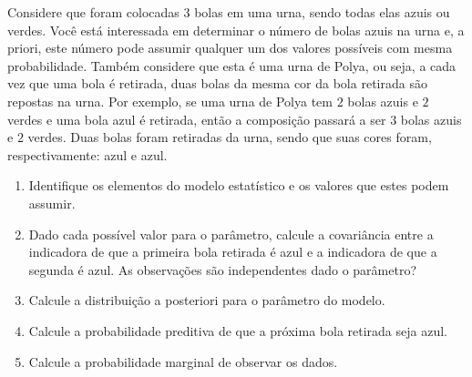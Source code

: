 \begin{exercise}
 Considere que foram colocadas $3$ bolas em uma urna,
 sendo todas elas azuis ou verdes.
 Você está interessada em determinar o
 número de bolas azuis na urna e,
 a priori, este número pode assumir qualquer um
 dos valores possíveis com mesma probabilidade.
 Também considere que esta é uma urna de Polya,
 ou seja, a cada vez que uma bola é retirada,
 duas bolas da mesma cor da bola retirada são
 repostas na urna.
 Por exemplo, se uma urna de Polya tem
 $2$ bolas azuis e $2$ verdes
 e uma bola azul é retirada,
 então a composição passará a ser
 $3$ bolas azuis e $2$ verdes.
 Duas bolas foram retiradas da urna,
 sendo que suas cores foram, respectivamente:
 azul e azul.
 \begin{enumerate}[label=(\alph*)]
  \item Identifique os elementos do
  modelo estatístico e os valores que
  estes podem assumir.
  \item Dado cada possível valor para o parâmetro,
  calcule a covariância entre a indicadora de que a
  primeira bola retirada é azul e a
  indicadora de que a segunda é azul.
  As observações são independentes dado o parâmetro?
  \item Calcule a distribuição a posteriori para
  o parâmetro do modelo.
  \item Calcule a probabilidade preditiva de que
  a próxima bola retirada seja azul.
  \item Calcule a probabilidade marginal de
  observar os dados.
 \end{enumerate}
\end{exercise}

